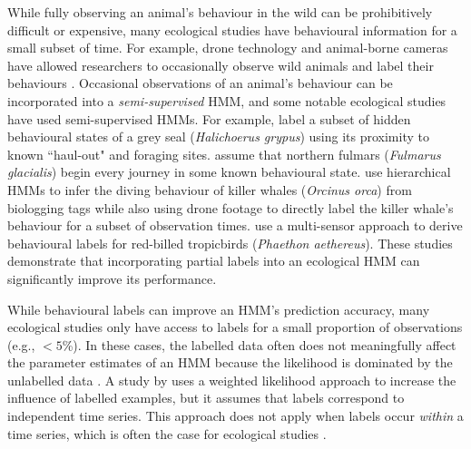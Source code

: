 While fully observing an animal's behaviour in the wild can be prohibitively difficult or expensive, many ecological studies have behavioural information for a small subset of time. For example, drone technology and animal-borne cameras have allowed researchers to occasionally observe wild animals and label their behaviours \citep{McRae:2024}. Occasional observations of an animal's behaviour can be incorporated into a \textit{semi-supervised} HMM, and some notable ecological studies have used semi-supervised HMMs. For example, \citet{McClintock:2012} label a subset of hidden behavioural states of a grey seal (\textit{Halichoerus grypus}) using its proximity to known ``haul-out" and foraging sites. \citet{Pirotta:2018} assume that northern fulmars (\textit{Fulmarus glacialis}) begin every journey in some known behavioural state. \citet{McRae:2024} use hierarchical HMMs to infer the diving behaviour of killer whales (\textit{Orcinus orca}) from biologging tags while also using drone footage to directly label the killer whale's behaviour for a subset of observation times. \citet{Saldanha:2023} use a multi-sensor approach to derive behavioural labels for red-billed tropicbirds (\textit{Phaethon aethereus}). These studies demonstrate that incorporating partial labels into an ecological HMM can significantly improve its performance.

While behavioural labels can improve an HMM's prediction accuracy, many ecological studies only have access to labels for a small proportion of observations (e.g., $< 5$\%). In these cases, the labelled data often does not meaningfully affect the parameter estimates of an HMM because the likelihood is dominated by the unlabelled data \citep{Chapelle:2006, Ren:2020}. A study by \citet{Ji:2009} uses a weighted likelihood approach to increase the influence of labelled examples, but it assumes that labels correspond to independent time series. This approach does not apply when labels occur \textit{within} a time series, which is often the case for ecological studies \citep{Saldanha:2023, McRae:2024}. 

